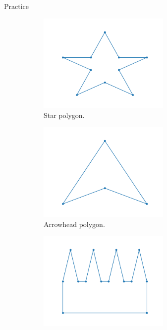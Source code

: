 \documentclass{beamer}
\begin{document}
\begin{frame}{Practice}
	\begin{figure}[h!]
		\centering
		\begin{subfigure}{0.45\textwidth}
			\centering
			\includegraphics[width = 0.7\textwidth]{Images/pentagram.png}
			\caption{Star polygon.}
			\label{fig:star}
		\end{subfigure}
		\begin{subfigure}{0.45\textwidth}
			\centering
			\includegraphics[width = 0.7\textwidth]{Images/concave_triangle.png}
			\caption{Arrowhead polygon.}
			\label{fig:concave}
		\end{subfigure}
		\begin{subfigure}{0.45\textwidth}
			\centering
			\includegraphics[width = 0.7\textwidth]{Images/comb.png}

\end{subfigure}
\end{figure}
\end{frame}
\end{document}
